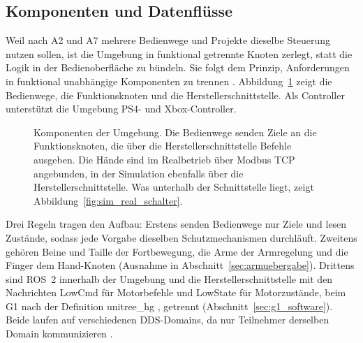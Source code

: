 \subsection{Komponenten und Datenflüsse}
\label{sec:komponenten}
Weil nach A2 und A7 mehrere Bedienwege und Projekte dieselbe Steuerung nutzen sollen, ist die Umgebung in funktional getrennte Knoten zerlegt, statt die Logik in der Bedienoberfläche zu bündeln.
Sie folgt dem Prinzip, Anforderungen in funktional unabhängige Komponenten zu trennen \cite{Macenski2022}.
Abbildung~\ref{fig:architektur} zeigt die Bedienwege, die Funktionsknoten und die Herstellerschnittstelle.
Als Controller unterstützt die Umgebung PS4- und Xbox-Controller.

\begin{figure}[htbp]
  \centering
  
  \caption[Komponenten der Umgebung]{Komponenten der Umgebung. Die Bedienwege senden Ziele an die Funktionsknoten, die über die Herstellerschnittstelle Befehle ausgeben. Die Hände sind im Realbetrieb über Modbus TCP angebunden, in der Simulation ebenfalls über die Herstellerschnittstelle. Was unterhalb der Schnittstelle liegt, zeigt Abbildung~\ref{fig:sim_real_schalter}.}
  \label{fig:architektur}
\end{figure}

Drei Regeln tragen den Aufbau: Erstens senden Bedienwege nur Ziele und lesen Zustände, sodass jede Vorgabe dieselben Schutzmechanismen durchläuft.
Zweitens gehören Beine und Taille der Fortbewegung, die Arme der Armregelung und die Finger dem Hand-Knoten (Ausnahme in Abschnitt~\ref{sec:armuebergabe}).
Drittens sind ROS~2 innerhalb der Umgebung und die Herstellerschnittstelle mit den Nachrichten LowCmd für Motorbefehle und LowState für Motorzustände, beim G1 nach der Definition unitree\_hg \cite{UnitreeMujoco}, getrennt (Abschnitt~\ref{sec:g1_software}).
Beide laufen auf verschiedenen DDS-Domains, da nur Teilnehmer derselben Domain kommunizieren \cite{OMG2015}.

